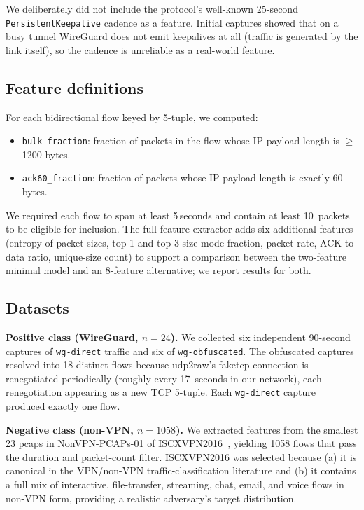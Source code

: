 \documentclass[conference]{IEEEtran}
\begin{document}
We deliberately did not include the protocol's well-known 25-second
\texttt{PersistentKeepalive} cadence as a feature. Initial captures
showed that on a busy tunnel WireGuard does not emit keepalives at all
(traffic is generated by the link itself), so the cadence is unreliable as
a real-world feature.

\subsection{Feature definitions}

For each bidirectional flow keyed by 5-tuple, we computed:

\begin{itemize}
  \item \texttt{bulk\_fraction}: fraction of packets in the flow whose
        IP payload length is $\geq$1200 bytes.
  \item \texttt{ack60\_fraction}: fraction of packets whose IP payload
        length is exactly 60 bytes.
\end{itemize}

We required each flow to span at least 5\,seconds and contain at least
10~packets to be eligible for inclusion. The full feature extractor adds
six additional features (entropy of packet sizes, top-1 and top-3 size
mode fraction, packet rate, ACK-to-data ratio, unique-size count) to
support a comparison between the two-feature minimal model and an
8-feature alternative; we report results for both.

\subsection{Datasets}

\textbf{Positive class (WireGuard, $n=24$).} We collected six independent
90-second captures of \texttt{wg-direct} traffic and six of
\texttt{wg-obfuscated}. The obfuscated captures resolved into 18 distinct
flows because udp2raw's faketcp connection is renegotiated periodically
(roughly every 17~seconds in our network), each renegotiation appearing as
a new TCP 5-tuple. Each \texttt{wg-direct} capture produced exactly one
flow.

\textbf{Negative class (non-VPN, $n=1058$).} We extracted features from
the smallest 23 pcaps in NonVPN-PCAPs-01 of
ISCXVPN2016~\cite{draper2016iscx}, yielding 1058 flows that pass the
duration and packet-count filter. ISCXVPN2016 was selected because (a) it
is canonical in the VPN/non-VPN traffic-classification literature and (b)
it contains a full mix of interactive, file-transfer, streaming, chat,
email, and voice flows in non-VPN form, providing a realistic adversary's
target distribution.
\end{document}
